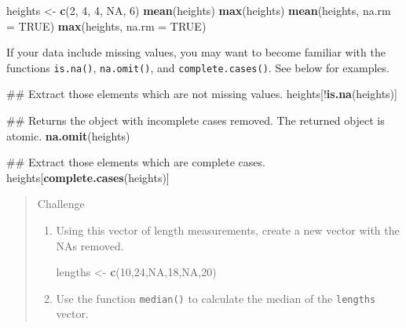 \documentclass[]{book}
\newenvironment{Shaded}{\begin{snugshade}}{\end{snugshade}}
\newcommand{\KeywordTok}[1]{\textcolor[rgb]{0.13,0.29,0.53}{\textbf{{#1}}}}
\newcommand{\DataTypeTok}[1]{\textcolor[rgb]{0.13,0.29,0.53}{{#1}}}
\newcommand{\DecValTok}[1]{\textcolor[rgb]{0.00,0.00,0.81}{{#1}}}
\newcommand{\StringTok}[1]{\textcolor[rgb]{0.31,0.60,0.02}{{#1}}}
\newcommand{\OtherTok}[1]{\textcolor[rgb]{0.56,0.35,0.01}{{#1}}}
\newcommand{\NormalTok}[1]{{#1}}
\theoremstyle{definition}
\theoremstyle{definition}
\theoremstyle{remark}
\begin{document}
\begin{Shaded}
\begin{Highlighting}[]
\NormalTok{heights <-}\StringTok{ }\KeywordTok{c}\NormalTok{(}\DecValTok{2}\NormalTok{, }\DecValTok{4}\NormalTok{, }\DecValTok{4}\NormalTok{, }\OtherTok{NA}\NormalTok{, }\DecValTok{6}\NormalTok{)}
\KeywordTok{mean}\NormalTok{(heights)}
\KeywordTok{max}\NormalTok{(heights)}
\KeywordTok{mean}\NormalTok{(heights, }\DataTypeTok{na.rm =} \OtherTok{TRUE}\NormalTok{)}
\KeywordTok{max}\NormalTok{(heights, }\DataTypeTok{na.rm =} \OtherTok{TRUE}\NormalTok{)}
\end{Highlighting}
\end{Shaded}

If your data include missing values, you may want to become familiar
with the functions \texttt{is.na()}, \texttt{na.omit()}, and
\texttt{complete.cases()}. See below for examples.

\begin{Shaded}
\begin{Highlighting}[]
\NormalTok{## Extract those elements which are not missing values.}
\NormalTok{heights[!}\KeywordTok{is.na}\NormalTok{(heights)]}

\NormalTok{## Returns the object with incomplete cases removed. The returned object is atomic.}
\KeywordTok{na.omit}\NormalTok{(heights)}

\NormalTok{## Extract those elements which are complete cases.}
\NormalTok{heights[}\KeywordTok{complete.cases}\NormalTok{(heights)]}
\end{Highlighting}
\end{Shaded}

\begin{quote}
Challenge

\begin{enumerate}
\def\labelenumi{\arabic{enumi}.}
\item
  Using this vector of length measurements, create a new vector with the
  NAs removed.

\begin{Shaded}
\begin{Highlighting}[]
\NormalTok{lengths <-}\StringTok{ }\KeywordTok{c}\NormalTok{(}\DecValTok{10}\NormalTok{,}\DecValTok{24}\NormalTok{,}\OtherTok{NA}\NormalTok{,}\DecValTok{18}\NormalTok{,}\OtherTok{NA}\NormalTok{,}\DecValTok{20}\NormalTok{)}
\end{Highlighting}
\end{Shaded}
\item
  Use the function \texttt{median()} to calculate the median of the
  \texttt{lengths} vector.
\end{enumerate}
\end{quote}
\end{document}
